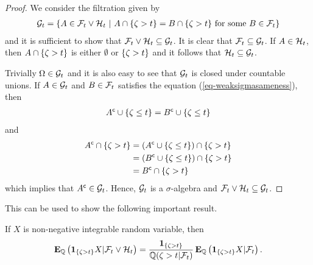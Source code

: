\begin{proof}
	We consider the filtration given by
	\begin{align}
	\mathcal{G}_t = \{ A \in \mathcal{F}_t \vee \mathcal{H}_t \ | \ A \cap \{ \zeta > t \} = B \cap \{ \zeta > t \} \textup{ for some } B \in \mathcal{F}_t \}
	\end{align}
	and it is sufficient to show that $\mathcal{F}_t \vee \mathcal{H}_t \subseteq \mathcal{G}_t$. It is clear that $\mathcal{F}_t \subseteq \mathcal{G}_t$. If $A \in \mathcal{H}_t$, then $A \cap \{ \zeta > t \}$ is either $\emptyset$ or $\{ \zeta > t \}$ and it follows that $\mathcal{H}_t \subseteq \mathcal{G}_t$.
	
	Trivially $\Omega \in \mathcal{G}_t$ and it is also easy to see that $\mathcal{G}_t$ is closed under countable unions. If $A \in \mathcal{G}_t$ and $B \in \mathcal{F}_t$ satisfies the equation (\ref{eq-weaksigmasameness}), then 
	\begin{align}
	{A}^{\mathsf{c}} \cup \{ \zeta \leq t \} = {B}^{\mathsf{c}} \cup \{ \zeta \leq t \}
	\end{align}
	and 
	\begin{align}
	{A}^{\mathsf{c}} \cap \{ \zeta > t \} &= ( {A}^{\mathsf{c}} \cup \{ \zeta \leq t \} ) \cap \{ \zeta > t \} \\ 
	&= ( {B}^{\mathsf{c}} \cup \{ \zeta \leq t \} ) \cap \{ \zeta > t \} \\
	&= {B}^{\mathsf{c}} \cap \{ \zeta > t \}
	\end{align} 
	which implies that ${A}^{\mathsf{c}} \in \mathcal{G}_t$. Hence, $\mathcal{G}_t$ is a $\sigma$-algebra and $\mathcal{F}_t \vee \mathcal{H}_t \subseteq \mathcal{G}_t$.
\end{proof}

This can be used to show the following important result.

\begin{lemma}
\label{lemma_takingthedefaultinformationout}
If $X$ is non-negative integrable random variable, then
	\begin{align}
	\operatorname{\boldsymbol{\mathrm{E}}}_{\mathbb{Q}} \left( \boldsymbol{1}_{ \{ \zeta > t \} } X | \mathcal{F}_t \vee \mathcal{H}_t \right) = \frac{\boldsymbol{1}_{ \{ \zeta > t \} }}{\mathbb{Q} (\zeta > t | \mathcal{F}_t )} \operatorname{\boldsymbol{\mathrm{E}}}_{\mathbb{Q}}  \left( \boldsymbol{1}_{ \{ \zeta > t \} } X | \mathcal{F}_t \right) .
	\end{align}
\end{lemma}

